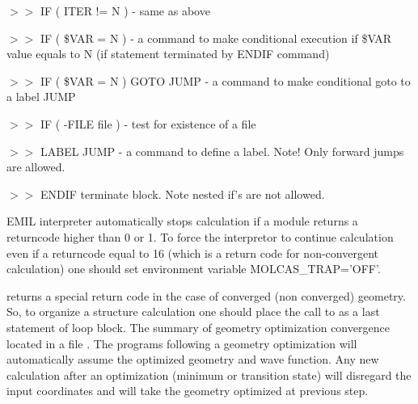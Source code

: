 \begin{commandlist}
\item[$>>$ IF ( ITER != N ) ] - same as above
\item[$>>$ IF ( \$VAR = N ) ] - a command to make conditional execution if \$VAR value equals to N (if statement terminated by ENDIF command)
\item[$>>$ IF ( \$VAR = N ) GOTO JUMP ] - a command to make conditional goto to a label JUMP
\item[$>>$ IF ( -FILE file ) ] - test for existence of a file
\item[$>>$ LABEL JUMP ] - a command to define a label. Note! Only forward jumps are allowed.


\item[$>>$ ENDIF ] terminate  block. Note nested if's are not allowed.
\end{commandlist}

EMIL interpreter automatically stops calculation if a module returns a returncode
higher than 0 or 1. To force the interpretor to continue calculation even if a
returncode equal to 16 (which is a return code for non-convergent calculation) one
should set environment variable MOLCAS\_TRAP='OFF'.

 returns a special return code in the case of converged (non converged) geometry.
So, to organize a structure calculation one should place the call to
 as a last statement of loop block. The summary of geometry optimization
convergence located in a file .
The programs following a geometry optimization will automatically
assume the optimized geometry and wave function. Any new 
calculation after an optimization (minimum or transition state) will
disregard the input coordinates and will take the geometry optimized at previous step.

